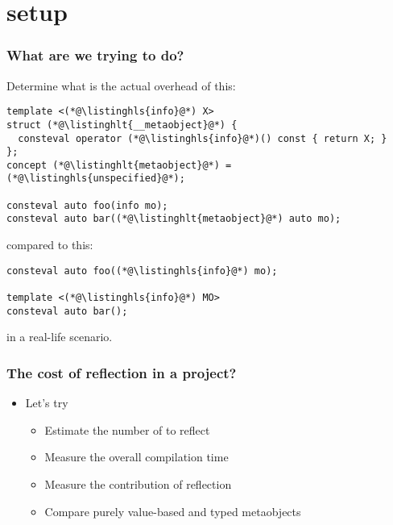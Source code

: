 \documentclass[compress,table,xcolor=table]{beamer}
\begin{document}
\section{setup}
\begin{frame}[fragile]
  \frametitle{What are we trying to do?}
  Determine what is the actual overhead of this:
  \begin{lstlisting}[language=c++2x,basicstyle=\footnotesize\ttfamily]
template <(*@\listinghls{info}@*) X>
struct (*@\listinghlt{__metaobject}@*) {
  consteval operator (*@\listinghls{info}@*)() const { return X; }
};
concept (*@\listinghlt{metaobject}@*) = (*@\listinghls{unspecified}@*);

consteval auto foo(info mo);
consteval auto bar((*@\listinghlt{metaobject}@*) auto mo);
  \end{lstlisting}
  compared to this:
  \begin{lstlisting}[language=c++2x,basicstyle=\footnotesize\ttfamily]
consteval auto foo((*@\listinghls{info}@*) mo);

template <(*@\listinghls{info}@*) MO>
consteval auto bar();
  \end{lstlisting}
  in a real-life scenario.
\end{frame}
\begin{frame}
  \frametitle{The cost of reflection in a  project?}
  \LARGE
  \begin{itemize}
    \item Let's try 
    \begin{itemize}
      \Large
      \item Estimate the number of  to reflect
      \item Measure the overall compilation time
      \item Measure the contribution of reflection
      \item Compare purely value-based and typed metaobjects
    \end{itemize}
  \end{itemize}
\end{frame}
\end{document}
